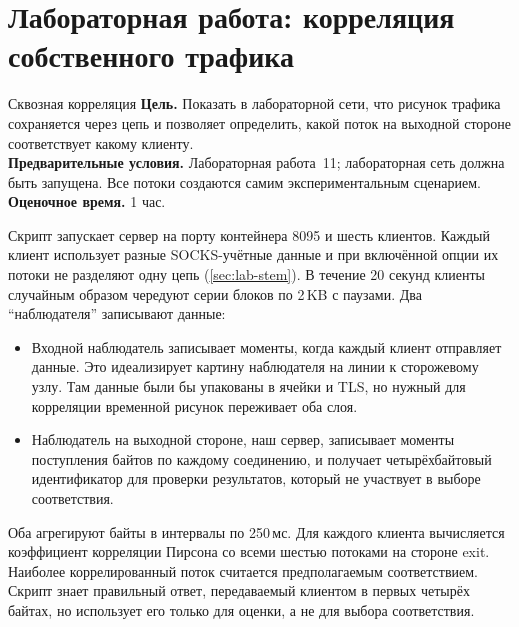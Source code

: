 \section{Лабораторная работа: корреляция собственного трафика}\label{sec:lab-attacchi}

\begin{laboratorio}[16]{Сквозная корреляция}
\textbf{Цель.} Показать в лабораторной сети, что рисунок трафика сохраняется через цепь и позволяет определить, какой поток на выходной стороне соответствует какому клиенту.\\
\textbf{Предварительные условия.} Лабораторная работа~11; лабораторная сеть должна быть запущена. Все потоки создаются самим экспериментальным сценарием.\\
\textbf{Оценочное время.} 1 час.
\end{laboratorio}

Скрипт  запускает сервер на порту контейнера 8095 и шесть клиентов. Каждый клиент использует разные SOCKS-учётные данные и при включённой опции  их потоки не разделяют одну цепь (\cref{sec:lab-stem}). В течение 20 секунд клиенты случайным образом чередуют серии блоков по 2\,KB с паузами. Два \enquote{наблюдателя} записывают данные:
\begin{itemize}
  \item Входной наблюдатель записывает моменты, когда каждый клиент отправляет данные. Это идеализирует картину наблюдателя на линии к сторожевому узлу. Там данные были бы упакованы в ячейки и TLS, но нужный для корреляции временной рисунок переживает оба слоя.
  \item Наблюдатель на выходной стороне, наш сервер, записывает моменты поступления байтов по каждому соединению, и получает четырёхбайтовый идентификатор для проверки результатов, который не участвует в выборе соответствия.
\end{itemize}
Оба агрегируют байты в интервалы по 250\,мс. Для каждого клиента вычисляется коэффициент корреляции Пирсона со всеми шестью потоками на стороне exit. Наиболее коррелированный поток считается предполагаемым соответствием. Скрипт знает правильный ответ, передаваемый клиентом в первых четырёх байтах, но использует его только для оценки, а не для выбора соответствия.

